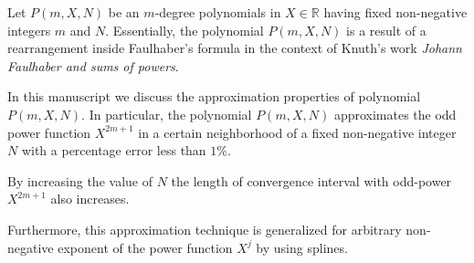 Let $P(m, X, N)$ be an $m$-degree polynomials in $X\in\mathbb{R}$
having fixed non-negative integers $m$ and $N$.
Essentially, the polynomial $P(m, X, N)$ is a result of a rearrangement inside Faulhaber's formula
in the context of Knuth's work \textit{Johann Faulhaber and sums of powers}.

In this manuscript we discuss the approximation properties of polynomial $P(m,X,N)$.
In particular, the polynomial $P(m,X,N)$ approximates the odd power function $X^{2m+1}$ in a certain neighborhood
of a fixed non-negative integer $N$ with a percentage error less than $1\%$.

By increasing the value of $N$ the length of convergence interval with odd-power $X^{2m+1}$ also increases.

Furthermore, this approximation technique is generalized for arbitrary non-negative exponent of the power function $X^j$
by using splines.
